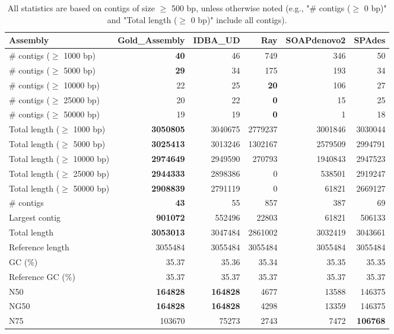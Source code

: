 \documentclass[12pt,a4paper]{article}
\begin{document}
\begin{table}[ht]
\begin{center}
\caption{All statistics are based on contigs of size $\geq$ 500 bp, unless otherwise noted (e.g., "\# contigs ($\geq$ 0 bp)" and "Total length ($\geq$ 0 bp)" include all contigs).}
\begin{tabular}{|l*{5}{|r}|}
\hline
Assembly & Gold\_Assembly & IDBA\_UD & Ray & SOAPdenovo2 & SPAdes \\ \hline
\# contigs ($\geq$ 1000 bp) & {\bf 40} & 46 & 749 & 346 & 50 \\ \hline
\# contigs ($\geq$ 5000 bp) & {\bf 29} & 34 & 175 & 193 & 34 \\ \hline
\# contigs ($\geq$ 10000 bp) & 22 & 25 & {\bf 20} & 106 & 27 \\ \hline
\# contigs ($\geq$ 25000 bp) & 20 & 22 & {\bf 0} & 15 & 25 \\ \hline
\# contigs ($\geq$ 50000 bp) & 19 & 19 & {\bf 0} & 1 & 18 \\ \hline
Total length ($\geq$ 1000 bp) & {\bf 3050805} & 3040675 & 2779237 & 3001846 & 3030044 \\ \hline
Total length ($\geq$ 5000 bp) & {\bf 3025413} & 3013246 & 1302167 & 2579509 & 2994791 \\ \hline
Total length ($\geq$ 10000 bp) & {\bf 2974649} & 2949590 & 270793 & 1940843 & 2947523 \\ \hline
Total length ($\geq$ 25000 bp) & {\bf 2944333} & 2898386 & 0 & 538501 & 2919247 \\ \hline
Total length ($\geq$ 50000 bp) & {\bf 2908839} & 2791119 & 0 & 61821 & 2669127 \\ \hline
\# contigs & {\bf 43} & 55 & 857 & 387 & 69 \\ \hline
Largest contig & {\bf 901072} & 552496 & 22803 & 61821 & 506133 \\ \hline
Total length & {\bf 3053013} & 3047484 & 2861002 & 3032419 & 3043661 \\ \hline
Reference length & 3055484 & 3055484 & 3055484 & 3055484 & 3055484 \\ \hline
GC (\%) & 35.37 & 35.36 & 35.34 & 35.35 & 35.35 \\ \hline
Reference GC (\%) & 35.37 & 35.37 & 35.37 & 35.37 & 35.37 \\ \hline
N50 & {\bf 164828} & {\bf 164828} & 4677 & 13588 & 146375 \\ \hline
NG50 & {\bf 164828} & {\bf 164828} & 4298 & 13359 & 146375 \\ \hline
N75 & 103670 & 75273 & 2743 & 7472 & {\bf 106768} \\ \hline

\end{tabular}
\end{center}
\end{table}
\end{document}
